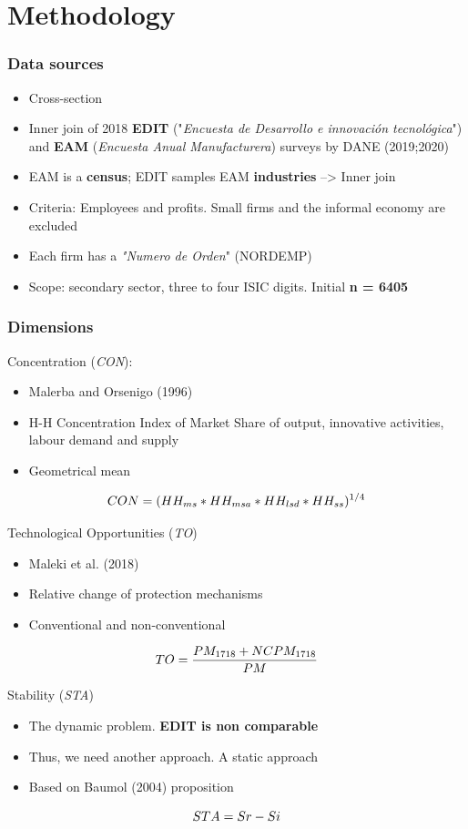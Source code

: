\documentclass{beamer}
\begin{document}
\section{Methodology}
	 \begin{frame}
	 	\frametitle{Data sources}
	 	\begin{itemize}
	 		\item Cross-section
	 		\item Inner join of 2018 \textbf{EDIT} ("\textit{Encuesta de Desarrollo
	 		e innovación tecnológica}") and \textbf{EAM} (\textit{Encuesta Anual Manufacturera}) surveys by DANE (2019;2020)
	 		\item EAM is a \textbf{census}; EDIT samples EAM \textbf{industries} --> Inner join
	 		\item Criteria: Employees and profits. Small firms and the informal economy are excluded
	 		\item Each firm has a \textit{"Numero de Orden}" (NORDEMP)
	 		\item Scope: secondary sector, three to four ISIC digits. Initial \textbf{n = 6405}
	 	\end{itemize}
	 \end{frame}
     \begin{frame}[allowframebreaks]
     	\frametitle{Dimensions}
     	Concentration (\textit{CON}):
     	\begin{itemize}
     		\item Malerba and Orsenigo (1996)
     		\item H-H Concentration Index of Market Share of output, innovative activities, labour demand and supply
     		\item Geometrical mean
     	\end{itemize} 
     	\begin{equation}
     		\centering
     		CON = (HH_{ms}*HH_{msa}*HH_{lsd}*HH_{ss})^{1/4}
     	\end{equation}
     \framebreak
     
     Technological Opportunities (\textit{TO})
     \begin{itemize}
     	\item Maleki et al. (2018)
     	\item Relative change of protection mechanisms 
     	\item Conventional and non-conventional
     \end{itemize}
 	 \begin{equation}
 	 \centering
 	 TO = \dfrac{PM_{1718} + NCPM_{1718}}{PM}
 	 \end{equation}
  	\framebreak
  	
  	Stability (\textit{STA})
  	\begin{itemize}
  		\item The dynamic problem.\textbf{ EDIT is non comparable}
  		\item Thus, we need another approach. A static approach
  		\item Based on Baumol (2004) proposition
  	\end{itemize}
  		\begin{equation}
  		\centering
  		STA = Sr - Si
  		\end{equation}
\end{frame}
\end{document}
